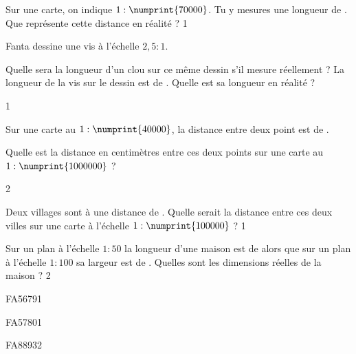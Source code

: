 \documentclass[a4paper,11pt]{report}
\begin{document}
\begin{exo}{
Sur une carte, on indique $1:\numprint{70000}$. Tu y mesures une longueur de . Que représente cette distance en réalité ?
}{1}    
\end{exo}

\begin{exo}{
Fanta dessine une vis à l'échelle $2,5:1$.
\begin{tasks}
    \task Quelle sera la longueur d'un clou sur ce même dessin s'il mesure réellement  ?
    \task La longueur de la vis sur le dessin est de . Quelle est sa longueur en réalité ?
\end{tasks}
}{1}
\end{exo}










\begin{exo}{
Sur une carte au $1:\numprint{40000}$, la distance entre deux point est de .

Quelle est la distance en centimètres entre ces deux points sur une carte au $1:\numprint{1000000}$ ?
}{2}    
\end{exo}


\begin{exo}{
Deux villages sont à une distance de . Quelle serait la distance entre ces deux villes sur une carte à l'échelle $1:\numprint{100000}$ ?
}{1}
\end{exo}

\begin{exo}{
Sur un plan à l'échelle $1:50$ la longueur d'une maison est de  alors que sur un plan à l'échelle $1:100$ sa largeur est de . Quelles sont les dimensions réelles de la maison ?
}{2}
\end{exo}
\begin{exol}{FA56}{79}{1} %
\end{exol}

\begin{exol}{FA57}{80}{1} %
\end{exol}

\begin{exof}{FA88}{93}{2} %
\end{exof}
\end{document}
